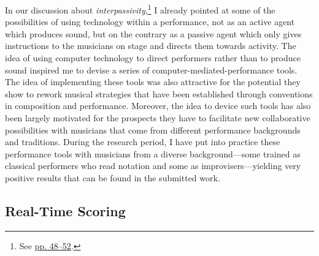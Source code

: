 In our discussion about \emph{interpassivity},\footnote{See \hyperlink{interpassiv}{pp. 48--52}.} I already pointed at some of the possibilities of using technology within a performance, not as an active agent which produces sound, but on the contrary as a passive agent which only gives instructions to the musicians on stage and directs them towards activity. The idea of using computer technology to direct performers rather than to produce sound inspired me to devise a series of computer-mediated-performance tools. The idea of implementing these tools was also attractive for the potential they show to rework musical strategies that have been established through conventions in composition and performance. Moreover, the idea to device such tools has also been largely motivated for the prospects they have to facilitate new collaborative possibilities with musicians that come from different performance backgrounds and traditions. During the research period, I have put into practice these performance tools with musicians from a diverse background---some trained as classical performers who read notation and some as improvisers---yielding very positive results that can be found in the submitted work.

\subsection{Real-Time Scoring}

